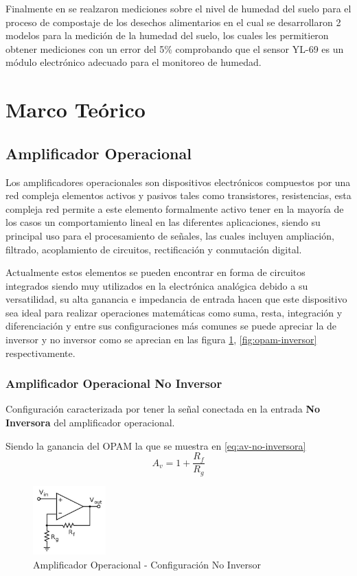 \documentclass[conference]{IEEEtran}
\begin{document}
	Finalmente en \cite{lowcosthumidity} se realzaron mediciones sobre el nivel de humedad del suelo para el proceso de compostaje de los desechos alimentarios en el cual se desarrollaron 2 modelos para la medición de la humedad del suelo, los cuales les permitieron obtener mediciones con un error del 5\% comprobando que el sensor YL-69 es un módulo electrónico adecuado para el monitoreo de humedad.
	
	\section{Marco Teórico} 
	\subsection{Amplificador Operacional}
	Los amplificadores operacionales son dispositivos electrónicos compuestos por una red compleja elementos activos y pasivos tales como transistores, resistencias, esta compleja red permite a este elemento formalmente activo tener en la mayoría de los casos un comportamiento lineal en las diferentes aplicaciones, siendo su principal uso para el procesamiento de señales, las cuales incluyen ampliación, filtrado, acoplamiento de circuitos, rectificación y conmutación digital.
	
	Actualmente estos elementos se pueden encontrar en forma de circuitos integrados siendo muy utilizados en la electrónica analógica debido a su versatilidad, su alta ganancia e impedancia de entrada hacen que este dispositivo sea ideal para realizar operaciones matemáticas como suma, resta, integración y diferenciación y entre sus configuraciones más comunes se puede apreciar la de inversor y no inversor como se aprecian en las figura \ref{fig:opam-no-inversor}, \ref{fig:opam-inversor} respectivamente.
	
	\subsubsection{Amplificador Operacional No Inversor}
	Configuración caracterizada por tener la señal conectada en la entrada \textbf{No Inversora} del amplificador operacional.
	
	Siendo la ganancia del OPAM la que se muestra en \ref{eq:av-no-inversora}
	\begin{equation}
		A_v = 1 + \frac{R_f}{R_g}
		\label{eq:av-no-inversora}
	\end{equation}
	\begin{figure}[h]
		\centering
		\includegraphics[width=0.25\textwidth]{media/opam-no-inversor}
		\caption{Amplificador Operacional - Configuración No Inversor}
		\label{fig:opam-no-inversor}
	\end{figure}
	
\end{document}

